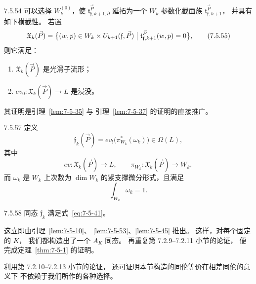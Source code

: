 \begin{lemma}{7.5.54}\label{lem:7-5-54}
可以选择 $W_k^{(0)}$，使
$\mathfrak t_{\mathfrak f,k+1,\partial}^{\vec P}$
延拓为一个 $W_k$ 参数化截面族
$\mathfrak t_{\mathfrak f,k+1}^{\vec P}$，
并具有如下横截性。
若置
\begin{equation}
\mathfrak X_k(\vec P)
=\bigl\{(w,p)\in
W_k\times U_{k+1}(\mathfrak f,\vec P)
\bigm|
\mathfrak t_{\mathfrak f,k+1}^{\vec P}(w,p)=0
\bigr\},
\tag{7.5.55}\label{eq:7-5-55}
\end{equation}
则它满足：
\begin{enumerate}[label=\textup{(7.5.56.\arabic*)},leftmargin=6em]
\item\label{eq:7-5-56-1}
$\mathfrak X_k(\vec P)$ 是光滑子流形；
\item\label{eq:7-5-56-2}
$ev_0\colon\mathfrak X_k(\vec P)\to L$ 是浸没。
\end{enumerate}
\end{lemma}

其证明是引理~\ref{lem:7-5-35} 与
引理~\ref{lem:7-5-37} 的证明的直接推广。

\begin{definition}{7.5.57}\label{def:7-5-57}
定义
\[
\mathfrak f_k(\vec P)
=ev_!\bigl(\pi_{W_k}^*(\omega_k)\bigr)
\in\Omega(L),
\]
其中
\[
ev\colon\mathfrak X_k(\vec P)\to L,
\qquad
\pi_{W_k}\colon\mathfrak X_k(\vec P)\to W_k,
\]
而 $\omega_k$ 是 $W_k$ 上次数为
$\dim W_k$ 的紧支撑微分形式，且满足
\[
\int_{W_k}\omega_k=1.
\]
\end{definition}

\begin{lemma}{7.5.58}\label{lem:7-5-58}
同态 $\mathfrak f_k$ 满足式~\eqref{eq:7-5-41}。
\end{lemma}

这立即由引理~\ref{lem:7-5-10}、
\ref{lem:7-5-53}、\ref{lem:7-5-45} 推出。
这样，对每个固定的 $K$，
我们都构造出了一个 $A_K$ 同态。
再重复第 7.2.9--7.2.11 小节的论证，
便完成定理~\ref{thm:7-5-1} 的证明。

利用第 7.2.10--7.2.13 小节的论证，
还可证明本节构造的同伦等价在相差同伦的意义下
不依赖于我们所作的各种选择。
